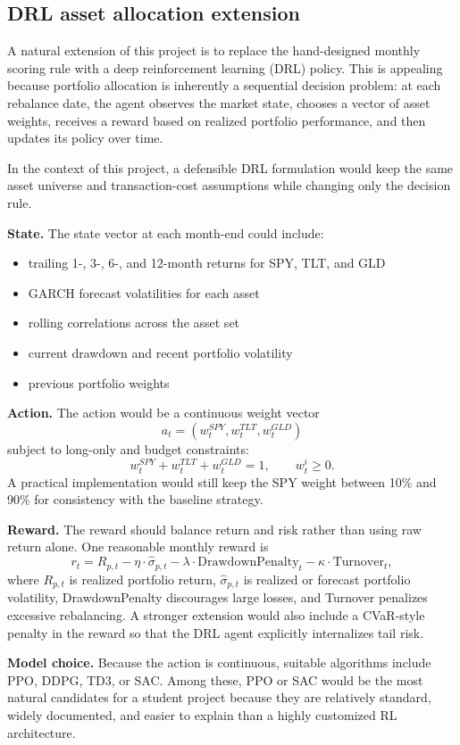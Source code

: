 \documentclass[11pt]{article}
\begin{document}
\subsection{DRL asset allocation extension}
A natural extension of this project is to replace the hand-designed monthly scoring rule with a deep reinforcement learning (DRL) policy. This is appealing because portfolio allocation is inherently a sequential decision problem: at each rebalance date, the agent observes the market state, chooses a vector of asset weights, receives a reward based on realized portfolio performance, and then updates its policy over time.

In the context of this project, a defensible DRL formulation would keep the same asset universe and transaction-cost assumptions while changing only the decision rule.

\textbf{State.} The state vector at each month-end could include:
\begin{itemize}
    \item trailing 1-, 3-, 6-, and 12-month returns for SPY, TLT, and GLD
    \item GARCH forecast volatilities for each asset
    \item rolling correlations across the asset set
    \item current drawdown and recent portfolio volatility
    \item previous portfolio weights
\end{itemize}

\textbf{Action.} The action would be a continuous weight vector
\[
a_t = (w^{SPY}_t, w^{TLT}_t, w^{GLD}_t)
\]
subject to long-only and budget constraints:
\[
w^{SPY}_t + w^{TLT}_t + w^{GLD}_t = 1, \qquad w^i_t \ge 0.
\]
A practical implementation would still keep the SPY weight between 10\% and 90\% for consistency with the baseline strategy.

\textbf{Reward.} The reward should balance return and risk rather than using raw return alone. One reasonable monthly reward is
\[
r_t = R_{p,t} - \eta \cdot \widehat{\sigma}_{p,t} - \lambda \cdot \text{DrawdownPenalty}_t - \kappa \cdot \text{Turnover}_t,
\]
where \(R_{p,t}\) is realized portfolio return, \(\widehat{\sigma}_{p,t}\) is realized or forecast portfolio volatility, DrawdownPenalty discourages large losses, and Turnover penalizes excessive rebalancing. A stronger extension would also include a CVaR-style penalty in the reward so that the DRL agent explicitly internalizes tail risk.

\textbf{Model choice.} Because the action is continuous, suitable algorithms include PPO, DDPG, TD3, or SAC. Among these, PPO or SAC would be the most natural candidates for a student project because they are relatively standard, widely documented, and easier to explain than a highly customized RL architecture.
\end{document}
